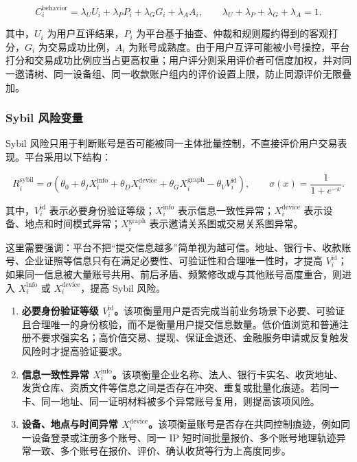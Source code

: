 \documentclass[UTF8,11pt]{ctexart}
\begin{document}
\[
    C_i^{\mathrm{behavior}}
    =
    \lambda_U U_i
    +
    \lambda_P P_i
    +
    \lambda_G G_i
    +
    \lambda_A A_i,
    \qquad
    \lambda_U+\lambda_P+\lambda_G+\lambda_A=1.
\]

其中，$U_i$ 为用户互评结果，$P_i$ 为平台基于抽查、仲裁和规则履约得到的客观打分，$G_i$ 为交易成功比例，$A_i$ 为账号成熟度。由于用户互评可能被小号操控，平台打分和交易成功比例应当占更高权重；用户评分则采用评价者可信度加权，并对同一邀请树、同一设备组、同一收款账户组内的评价设置上限，防止同源评价无限叠加。

\subsubsection*{Sybil 风险变量}

Sybil 风险只用于判断账号是否可能被同一主体批量控制，不直接评价用户交易表现。平台采用以下结构：

\[
    R_i^{\mathrm{sybil}}
    =
    \sigma\left(
    \theta_0
    +\theta_I X_i^{\mathrm{info}}
    +\theta_D X_i^{\mathrm{device}}
    +\theta_G X_i^{\mathrm{graph}}
    -\theta_V V_i^{\mathrm{id}}
    \right),
    \qquad
    \sigma(x)=\frac{1}{1+e^{-x}}.
\]

其中，$V_i^{\mathrm{id}}$ 表示必要身份验证等级；$X_i^{\mathrm{info}}$ 表示信息一致性异常；$X_i^{\mathrm{device}}$ 表示设备、地点和时间模式异常；$X_i^{\mathrm{graph}}$ 表示邀请关系图或交易关系图异常。

这里需要强调：平台不把“提交信息越多”简单视为越可信。地址、银行卡、收款账号、企业证照等信息只有在满足必要性、可验证性和合理唯一性时，才提高 $V_i^{\mathrm{id}}$；如果同一信息被大量账号共用、前后矛盾、频繁修改或与其他账号高度重合，则进入 $X_i^{\mathrm{info}}$ 或 $X_i^{\mathrm{device}}$，提高 Sybil 风险。

\begin{enumerate}[label=\arabic*.]
    \item \textbf{必要身份验证等级 $V_i^{\mathrm{id}}$。}该项衡量用户是否完成当前业务场景下必要、可验证且合理唯一的身份核验，而不是衡量用户提交信息数量。低价值浏览和普通注册不要求强实名；高价值交易、提现、保证金退还、金融服务申请或反复触发风险时才提高验证要求。

    \item \textbf{信息一致性异常 $X_i^{\mathrm{info}}$。}该项衡量企业名称、法人、银行卡实名、收货地址、发货仓库、资质文件等信息之间是否存在冲突、重复或批量化痕迹。若同一卡、同一地址、同一证明材料被多个异常账号复用，则提高该项风险。

    \item \textbf{设备、地点与时间异常 $X_i^{\mathrm{device}}$。}该项衡量账号是否存在共同控制痕迹，例如同一设备登录或注册多个账号、同一 IP 短时间批量报价、多个账号地理轨迹异常一致、多个账号在报价、评价、确认收货等行为上高度同步。
\end{enumerate}
\end{document}

